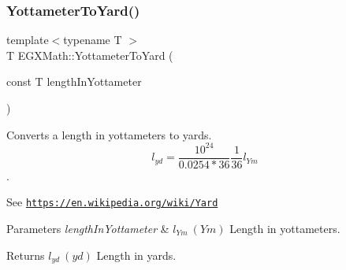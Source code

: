 \subsubsection{\texorpdfstring{Yottameter\+To\+Yard()}{YottameterToYard()}}
{\footnotesize\ttfamily template$<$typename T $>$ \\
T E\+G\+X\+Math\+::\+Yottameter\+To\+Yard (\begin{DoxyParamCaption}\item[{const T}]{length\+In\+Yottameter }\end{DoxyParamCaption})}



Converts a length in yottameters to yards. \[ l_{yd}= \frac{10^{24}}{0.0254 * 36} \frac{1}{36} l_{Ym} \]. 

See \href{https://en.wikipedia.org/wiki/Yard}{\tt https\+://en.\+wikipedia.\+org/wiki/\+Yard} 
\begin{DoxyParams}{Parameters}
{\em length\+In\+Yottameter} & $ l_{Ym}\ (Ym)$ Length in yottameters. \\
\hline
\end{DoxyParams}
\begin{DoxyReturn}{Returns}
$ l_{yd}\ (yd)$ Length in yards. 
\end{DoxyReturn}
